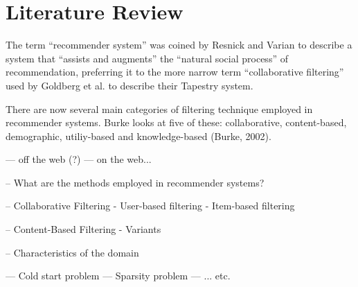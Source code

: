 \iffalse
Chapter 2: Literature Review and Context - the setting of the project in the context of other relevant work or theories or results. How this setting influenced the project.
\fi

\section{Literature Review}\label{literature review}

The term ``recommender system'' was coined by Resnick and Varian \cite{Resnick97} to describe  a system that ``assists and augments'' the ``natural social process'' of recommendation, preferring it to the more narrow term ``collaborative filtering'' used by Goldberg et al. \cite{Goldberg92}  to describe their Tapestry system. 

There are now several main categories of filtering technique employed in recommender systems. Burke \cite{Burke02} looks at five of these: collaborative, content-based, demographic, utiliy-based and knowledge-based (Burke, 2002). 





--- off the web (?)
--- on the web...

-- What are the methods employed in recommender systems?

-- Collaborative Filtering
  - User-based filtering
  - Item-based filtering

-- Content-Based Filtering
  - Variants

-- Characteristics of the domain

--- Cold start problem
--- Sparsity problem
--- ... etc.

